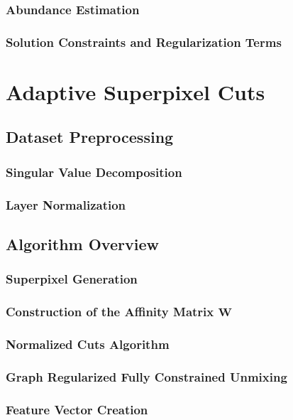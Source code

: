 \documentclass{article}
\begin{document}
\subsubsection{Abundance Estimation}
\subsubsection{Solution Constraints and Regularization Terms}

\clearpage
% 
% 
% 
% 
% 
\section{Adaptive Superpixel Cuts}

\subsection{Dataset Preprocessing}
\subsubsection{Singular Value Decomposition}
\subsubsection{Layer Normalization}

\clearpage
\subsection{Algorithm Overview}
\subsubsection{Superpixel Generation}
\subsubsection{Construction of the Affinity Matrix $\mathbf{W}$}
\subsubsection{Normalized Cuts Algorithm}
\subsubsection{Graph Regularized Fully Constrained Unmixing}
\subsubsection{Feature Vector Creation}
\end{document}
